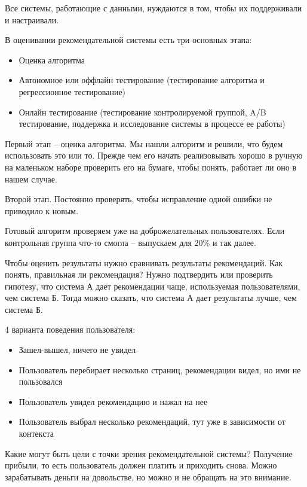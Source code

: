 
Все системы, работающие с данными, нуждаются в том, чтобы их поддерживали и настраивали.

В оценивании рекомендательной системы есть три основных этапа:

\begin{itemize}
    \item Оценка алгоритма
    \item Автономное или оффлайн тестирование (тестирование алгоритма и регрессионное тестирование)
    \item Онлайн тестирование (тестирование контролируемой группой, A/B тестирование, поддержка и исследование системы в процессе ее работы)
\end{itemize}

Первый этап -- оценка алгоритма. Мы нашли алгоритм и решили, что будем использовать это или то. Прежде чем его начать реализовывать хорошо в ручную на маленьком наборе проверить его на бумаге, чтобы понять, работает ли оно в нашем случае.

Второй этап. Постоянно проверять, чтобы исправление одной ошибки не приводило к новым.

Готовый алгоритм проверяем уже на доброжелательных пользователях. Если контрольная группа что-то смогла -- выпускаем для 20\% и так далее.

Чтобы оценить результаты нужно сравнивать результаты рекомендаций. Как понять, правильная ли рекомендация? Нужно подтвердить или проверить гипотезу, что система А дает рекомендации чаще, используемая пользователями, чем система Б. Тогда можно сказать, что система А дает результаты лучше, чем система Б. 

4 варианта поведения пользователя:

\begin{itemize}
    \item Зашел-вышел, ничего не увидел
    \item Пользователь перебирает несколько страниц, рекомендации видел, но ими не пользовался
    \item Пользователь увидел рекомендацию и нажал на нее
    \item Пользователь выбрал несколько рекомендаций, тут уже в зависимости от контекста
\end{itemize}

Какие могут быть цели с точки зрения рекомендательной системы? Получение прибыли, то есть пользователь должен платить и приходить снова. Можно зарабатывать деньги на довольстве, но можно и не обращать на это внимание.

